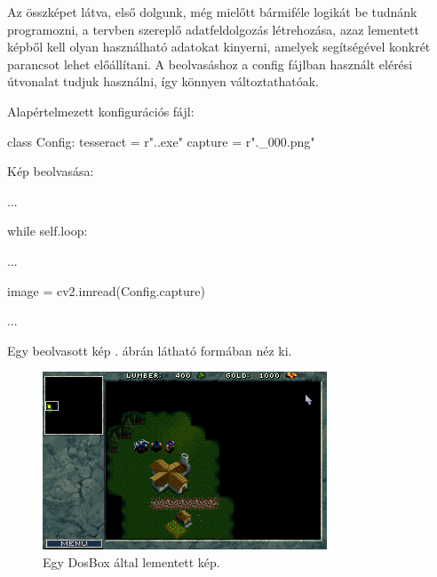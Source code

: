 Az összképet látva, első dolgunk, még mielőtt bármiféle logikát be tudnánk programozni, a tervben szereplő adatfeldolgozás létrehozása, azaz lementett képből kell olyan használható adatokat kinyerni, amelyek segítségével konkrét parancsot lehet előállítani. 
A beolvasáshoz a config fájlban használt elérési útvonalat tudjuk használni, így könnyen változtathatóak.

Alapértelmezett konfigurációs fájl:
\begin{python}
class Config:
    tesseract = r".\TesseractOCR\tesseract.exe"
    capture = r".\capture\war_000.png"
\end{python}

Kép beolvasása:
\begin{python}
    ...

    while self.loop:

        ... 
        
        image = cv2.imread(Config.capture)

        ...
\end{python}

Egy beolvasott kép . ábrán látható formában néz ki.

\begin{figure}[h]
\centering
\includegraphics[scale=1]{images/war_000.png}
\caption{Egy DosBox által lementett kép.}
\label{fig:abra}
\end{figure}

